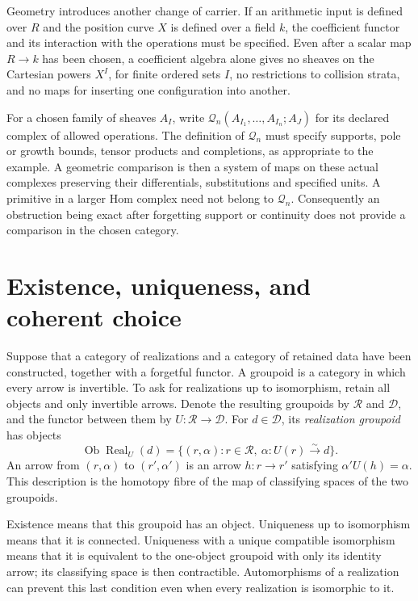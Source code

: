 Geometry introduces another change of carrier. If an arithmetic input
is defined over \(R\) and the position curve \(X\) is defined
over a field \(k\), the coefficient functor and its interaction with the
operations must be specified. Even after a scalar map \(R\to k\)
has been chosen, a coefficient algebra alone gives no sheaves on
the Cartesian powers \(X^I\), for finite ordered sets \(I\), no
restrictions to collision strata, and no maps for
inserting one configuration into another.

For a chosen family of sheaves \(A_I\), write
\(\mathcal Q_n(A_{I_1},\ldots,A_{I_n};A_J)\) for its declared
complex of allowed operations. The definition of \(\mathcal Q_n\)
must specify supports, pole or growth bounds, tensor products and
completions, as appropriate to the example. A geometric comparison
is then a system of maps on these actual complexes preserving their
differentials, substitutions and specified units. A primitive in a
larger Hom complex need not belong to \(\mathcal Q_n\).
Consequently an obstruction being exact after forgetting support or
continuity does not provide a comparison in the chosen category.

\section{Existence, uniqueness, and coherent choice}
\label{v4-marked:sec:spaces}

Suppose that a category of realizations and a category of retained
data have been constructed, together with a forgetful functor.
A groupoid is a category in which every arrow is invertible.
To ask for realizations up to isomorphism, retain all objects and
only invertible arrows. Denote the resulting groupoids by
\(\mathscr R\) and \(\mathscr D\), and the functor between
them by \(U:\mathscr R\to\mathscr D\).
For \(d\in\mathscr D\), its \emph{realization groupoid}
has objects
\begin{equation}\label{v4-marked:eq:fibre}
 \operatorname{Ob}\operatorname{Real}_U(d)
 =\{(r,\alpha):r\in\mathscr R,
                 \ \alpha:U(r)\xrightarrow{\sim}d\}.
\end{equation}
An arrow from \((r,\alpha)\) to \((r',\alpha')\) is an
arrow \(h:r\to r'\) satisfying \(\alpha' U(h)=\alpha\).
This description is the homotopy fibre of the map of classifying
spaces of the two groupoids.

Existence means that this groupoid has an object. Uniqueness up to
isomorphism means that it is connected. Uniqueness with a unique
compatible isomorphism means that it is equivalent to the one-object
groupoid with only its identity arrow; its classifying space is then
contractible. Automorphisms of a realization can prevent this last
condition even when every realization is isomorphic to it.

